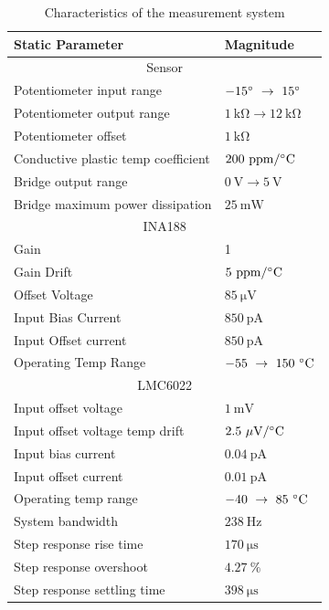 \documentclass[10pt,twocolumn]{witseiepaper}
\begin{document}
\begin{table}[h!]
	\caption{Characteristics of the measurement system} \label{tab:static}
	\begin{tabular}{|p{}| p{}|}
		\hline
		\textbf{Static Parameter} & \textbf{Magnitude} \\ \hline
		\multicolumn{2}{|c|}{Sensor} \\ \hline
		Potentiometer input range & $-15^\circ~\rightarrow~15^\circ$\\
		Potentiometer output range & $\mathrm{1~k\Omega \rightarrow 12~k\Omega}$\\
		Potentiometer offset & $\mathrm{1~k\Omega}$\\
		Conductive plastic temp coefficient & $\mathrm{200~ppm/^\circ C}$ \\
		Bridge output range & $\mathrm{0~V \rightarrow 5~V}$\\
		Bridge maximum power dissipation & $\mathrm{25~mW}$ \\ \hline
		\multicolumn{2}{|c|}{INA188} \\ \hline
		Gain & 1\\
		Gain Drift & $\mathrm{5~ppm/^\circ C}$ \\
		Offset Voltage & $\mathrm{85~\mu V}$ \\
		Input Bias Current & $\mathrm{850~pA}$\\
		Input Offset current & $\mathrm{850~pA}$\\
		Operating Temp Range & $\mathrm{-55~\rightarrow~150~^\circ C}$\\ \hline
		\multicolumn{2}{|c|}{LMC6022} \\ \hline
		Input offset voltage & $\mathrm{1~m V}$ \\
		Input offset voltage temp drift& $\mathrm{2.5~\mu V/ ^\circ C}$ \\
		Input bias current & $\mathrm{0.04~pA}$\\
		Input offset current & $\mathrm{0.01~pA}$\\
		Operating temp range & $\mathrm{-40~\rightarrow~85~^\circ C}$\\ \hline
		System bandwidth & $238~\mathrm{Hz}$ \\
		Step response rise time & $170~\mathrm{\mu s}$ \\
		Step response overshoot & $4.27~\%$ \\
		Step response settling time & $398~\mathrm{\mu s}$ \\
		\hline
	\end{tabular}
\end{table}
\end{document}
